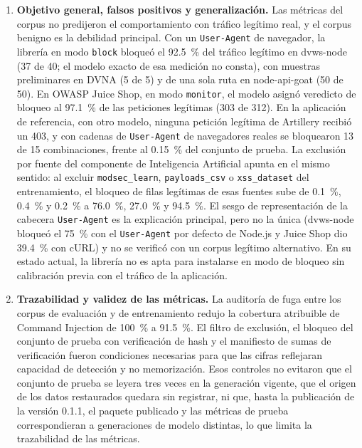 \begin{enumerate}
    \item \textbf{Objetivo general, falsos positivos y generalización.}\label{conc:fp} Las métricas del corpus no
    predijeron el comportamiento con tráfico legítimo real, y el corpus benigno es la debilidad
    principal. Con un \texttt{User-Agent} de navegador, la librería en modo \texttt{block} bloqueó el
    92.5~\% del tráfico legítimo en dvws-node (37 de 40; el modelo exacto de esa medición no consta),
    con muestras preliminares en DVNA (5 de 5) y de una sola ruta en node-api-goat (50 de 50). En
    OWASP Juice Shop, en modo \texttt{monitor}, el modelo asignó veredicto de bloqueo al 97.1~\% de
    las peticiones legítimas (303 de 312). En la aplicación de referencia, con otro modelo, ninguna
    petición legítima de Artillery recibió un 403, y con cadenas de \texttt{User-Agent} de
    navegadores reales se bloquearon 13 de 15 combinaciones, frente al 0.15~\% del conjunto de
    prueba. La exclusión por fuente del componente de Inteligencia Artificial \cite{valenzuela2026ia} apunta en el mismo
    sentido: al excluir \texttt{modsec\_learn}, \texttt{payloads\_csv} o \texttt{xss\_dataset} del
    entrenamiento, el bloqueo de filas legítimas de esas fuentes sube de 0.1~\%, 0.4~\% y 0.2~\% a
    76.0~\%, 27.0~\% y 94.5~\%. El sesgo de representación de la cabecera \texttt{User-Agent} es la
    explicación principal, pero no la única (dvws-node bloqueó el 75~\% con el \texttt{User-Agent}
    por defecto de Node.js y Juice Shop dio 39.4~\% con cURL) y no se verificó con un corpus legítimo
    alternativo. En su estado actual, la librería no es apta para instalarse en modo de bloqueo sin
    calibración previa con el tráfico de la aplicación.

    \item \textbf{Trazabilidad y validez de las métricas.}\label{conc:trazabilidad} La auditoría de fuga entre los corpus de
    evaluación y de entrenamiento redujo la cobertura atribuible de Command Injection de 100~\% a
    91.5~\%. El filtro de exclusión, el bloqueo del conjunto de prueba con verificación de hash y el
    manifiesto de sumas de verificación fueron condiciones necesarias para que las cifras reflejaran
    capacidad de detección y no memorización. Esos controles no evitaron que el conjunto de prueba
    se leyera tres veces en la generación vigente, que el origen de los datos restaurados quedara
    sin registrar, ni que, hasta la publicación de la versión 0.1.1, el paquete publicado y las
    métricas de prueba correspondieran a generaciones de modelo distintas, lo que limita la
    trazabilidad de las métricas.


\end{enumerate}
